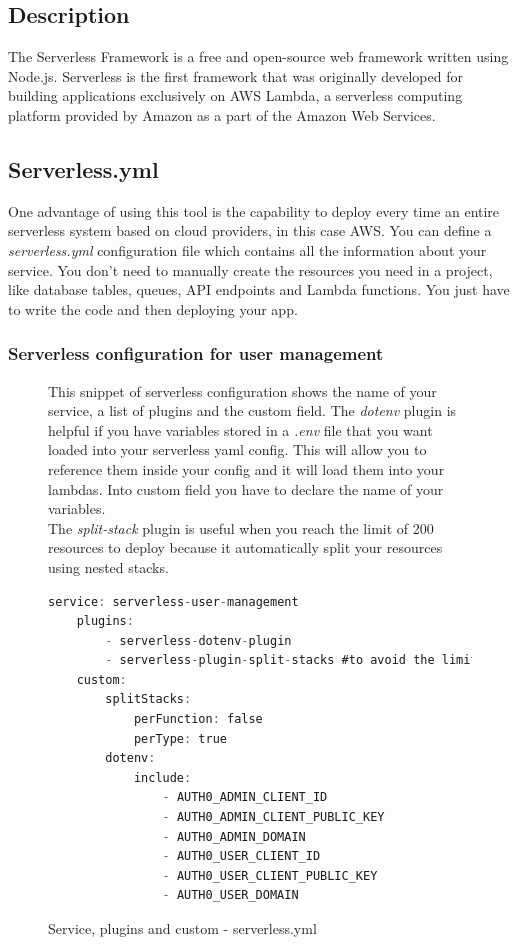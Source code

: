 \newpage
{}
\subsection{Description}
The Serverless Framework is a free and open-source web framework written using Node.js. Serverless is the first framework that was originally developed for building applications exclusively on AWS Lambda, a serverless computing platform provided by Amazon as a part of the Amazon Web Services.
\subsection{Serverless.yml}
One advantage of using this tool is the capability to deploy every time an entire serverless system based on cloud providers, in this case AWS. You can define a \emph{serverless.yml} configuration file which contains all the information about your service. You don't need to manually create the resources you need in a project, like database tables, queues, API endpoints and Lambda functions. You just have to write the code and then deploying your app.
\subsubsection{Serverless configuration for user management}
\begin{figure} [H]
This snippet of serverless configuration shows the name of your service, a list of plugins and the custom field. The \emph{dotenv} plugin is helpful if you have variables stored in a \emph{.env} file that you want loaded into your serverless yaml config. This will allow you to reference them inside your config and it will load them into your lambdas. Into custom field you have to declare the name of your variables.\\
The \emph{split-stack} plugin is useful when you reach the limit of 200 resources to deploy because it automatically split your resources using nested stacks.

\begin{lstlisting}[language=C]
	service: serverless-user-management
	plugins:
		- serverless-dotenv-plugin
		- serverless-plugin-split-stacks #to avoid the limit of 200 resources
	custom:
		splitStacks:
			perFunction: false
			perType: true
		dotenv: 
			include:
				- AUTH0_ADMIN_CLIENT_ID
				- AUTH0_ADMIN_CLIENT_PUBLIC_KEY
				- AUTH0_ADMIN_DOMAIN
				- AUTH0_USER_CLIENT_ID
				- AUTH0_USER_CLIENT_PUBLIC_KEY
				- AUTH0_USER_DOMAIN
\end{lstlisting}
	\caption{Service, plugins and custom - serverless.yml}\label{}
\end{figure}


